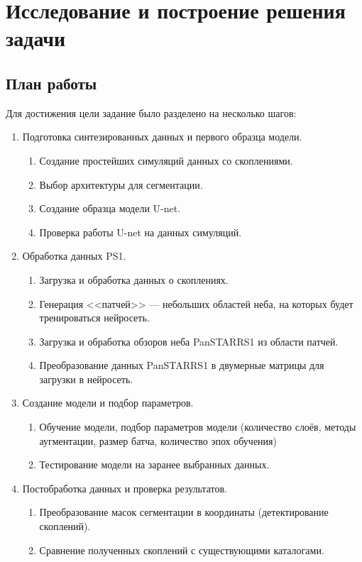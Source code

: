 \chapter{Исследование и построение решения задачи}
\label{cha:ch_3}

\section{План работы}
Для достижения цели задание было разделено на несколько шагов:

\begin{enumerate}

    \item Подготовка синтезированных данных и первого образца модели.
    \begin{enumerate}
        \item Создание простейших симуляций данных со скоплениями.
        \item Выбор архитектуры для сегментации.
        \item Создание образца модели U-net.
        \item Проверка работы U-net на данных симуляций.
    \end{enumerate}

    \item Обработка данных PS1.
    \begin{enumerate}
        \item Загрузка и обработка данных о скоплениях.
        \item Генерация <<патчей>> --- небольших областей неба, на которых будет тренироваться нейросеть.
        \item Загрузка и обработка обзоров неба PanSTARRS1 из области патчей.
        \item Преобразование данных PanSTARRS1 в двумерные матрицы для загрузки в нейросеть.
    \end{enumerate}

    \item Создание модели и подбор параметров.
    \begin{enumerate}
        \item Обучение модели, подбор параметров модели (количество слоёв, методы аугментации, размер 
            батча, количество эпох обучения)
        \item Тестирование модели на заранее выбранных данных.
    \end{enumerate}

    \item Постобработка данных и проверка результатов.
    \begin{enumerate}
        \item Преобразование масок сегментации в координаты (детектирование скоплений).
        \item Сравнение полученных скоплений с существующими каталогами.
    \end{enumerate}
\end{enumerate}

